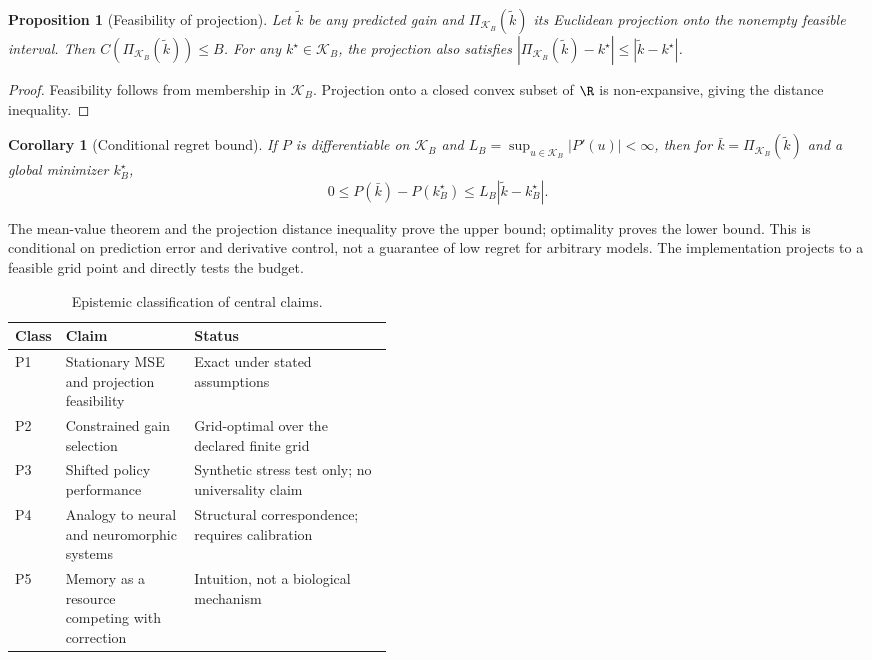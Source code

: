 \documentclass[10pt,a4paper]{article}
\newtheorem{proposition}{Proposition}
\newtheorem{corollary}{Corollary}
\begin{document}
\begin{proposition}[Feasibility of projection]
Let $\widetilde{k}$ be any predicted gain and $\Pi_{\mathcal{K}_B}(\widetilde{k})$ its Euclidean projection onto the nonempty feasible interval. Then $C(\Pi_{\mathcal{K}_B}(\widetilde{k}))\leq B$. For any $k^\star\in\mathcal{K}_B$, the projection also satisfies $|\Pi_{\mathcal{K}_B}(\widetilde{k})-k^\star|\leq|\widetilde{k}-k^\star|$.
\end{proposition}
\begin{proof}
Feasibility follows from membership in $\mathcal{K}_B$. Projection onto a closed convex subset of $\R$ is non-expansive, giving the distance inequality.
\end{proof}
\begin{corollary}[Conditional regret bound]
If $P$ is differentiable on $\mathcal{K}_B$ and $L_B=\sup_{u\in\mathcal{K}_B}|P'(u)|<\infty$, then for $\bar{k}=\Pi_{\mathcal{K}_B}(\widetilde{k})$ and a global minimizer $k_B^\star$,
\[
0\leq P(\bar{k})-P(k_B^\star)\leq L_B|\widetilde{k}-k_B^\star|.
\]
\end{corollary}
The mean-value theorem and the projection distance inequality prove the upper bound; optimality proves the lower bound. This is conditional on prediction error and derivative control, not a guarantee of low regret for arbitrary models. The implementation projects to a feasible grid point and directly tests the budget.

\begin{table}[htbp]\centering
\caption{Epistemic classification of central claims.}\label{tab:epistemic}\small
\begin{tabularx}{\linewidth}{@{}p{0.10\linewidth}p{0.34\linewidth}X@{}}
\toprule
Class & Claim & Status\\\midrule
P1 & Stationary MSE and projection feasibility & Exact under stated assumptions\\
P2 & Constrained gain selection & Grid-optimal over the declared finite grid\\
P3 & Shifted policy performance & Synthetic stress test only; no universality claim\\
P4 & Analogy to neural and neuromorphic systems & Structural correspondence; requires calibration\\
P5 & Memory as a resource competing with correction & Intuition, not a biological mechanism\\
\bottomrule
\end{tabularx}\end{table}
\end{document}
